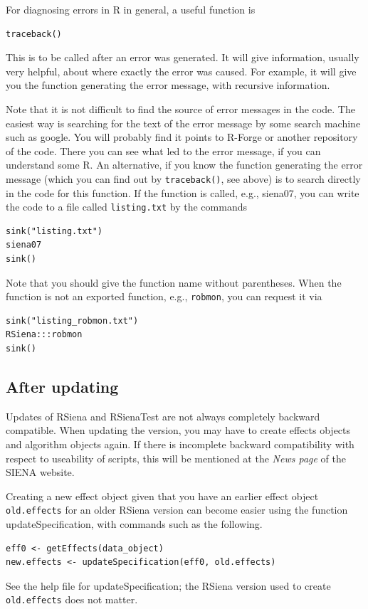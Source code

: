 \documentclass[a4paper,fleqn,11pt]{article}
\newcommand{\+}{\, + \,}
\newcommand{\sfn}[1]{\textsf{#1}}
\newcommand{\RS}{{\sf RSiena }}
\newcommand{\SI}{{\sf SIENA }}
\begin{document}
For diagnosing errors in R in general, a useful function is
\begin{verbatim}
traceback()
\end{verbatim}
This is to be called after an error was generated. It will give information,
usually very helpful, about where exactly the error was caused.
For example, it will give you the function generating the error message,
with recursive information.
\medskip

Note that it is not difficult to find the source of error messages in the code.
The easiest way is searching for the text of the error message
by some search machine such as google.
You will probably find it points to R-Forge or another repository of the code.
There you can see what led to the error message, if you can understand some R.
An alternative, if you know the function generating the error message
(which you can find out by \texttt{traceback()}, see above)
is to search directly in the code for this function.
If the function is called, e.g., \textsf{siena07}, you can write
the code to a file called \texttt{listing.txt} by the commands
\begin{verbatim}
sink("listing.txt")
siena07
sink()
\end{verbatim}
Note that you should give the function name without parentheses.
When the function is not an exported function, e.g., \texttt{robmon},
you can request it via
\begin{verbatim}
sink("listing_robmon.txt")
RSiena:::robmon
sink()
\end{verbatim}


\subsection{After updating}

\noindent
Updates of \RS and \textsf{RSienaTest} are not always completely backward
compatible. When updating the version, you may have to create
effects objects and algorithm objects again. If there is
incomplete backward compatibility with respect to
useability of scripts, this will be mentioned at the \emph{News page}
of the \SI website.

Creating a new effect object given that you have an earlier effect
object \texttt{old.effects} for an older \RS version can become
easier using the function \sfn{updateSpecification},
with commands such as the following.
\begin{verbatim}
eff0 <- getEffects(data_object)
new.effects <- updateSpecification(eff0, old.effects)
\end{verbatim}
See the help file for  \sfn{updateSpecification};
the \RS version used to create \texttt{old.effects} does not matter.
\end{document}
